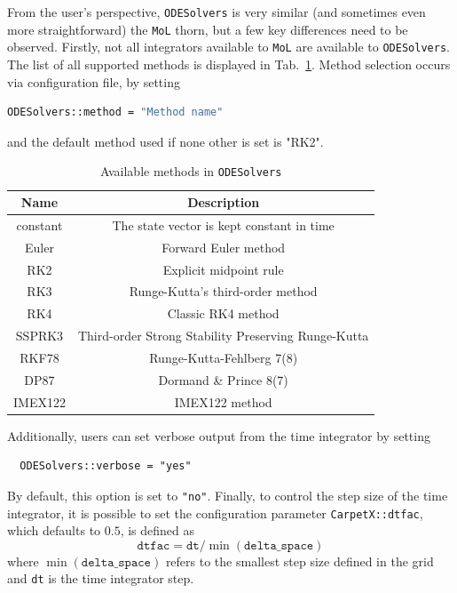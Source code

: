 From the user's perspective, \texttt{ODESolvers} is very similar (and sometimes even more straightforward) the \texttt{MoL} thorn, but a few key differences need to be observed. Firstly, not all integrators available to \texttt{MoL} are available to \texttt{ODESolvers}. The list of all supported methods is displayed in Tab.~\ref{tab:odesolvers_methods}. Method selection occurs via configuration file, by setting
%
\begin{lstlisting}[language=bash]
  ODESolvers::method = "Method name"
\end{lstlisting}
%
and the default method used if none other is set is "RK2".

\begin{table}[hb]
  \centering
  \begin{tabular}{cc}
  Name           & Description                                         \\ \hline\hline
  constant       & The state vector is kept constant in time           \\
  Euler          & Forward Euler method                                \\
  RK2            & Explicit midpoint rule                              \\
  RK3            & Runge-Kutta's third-order method                    \\
  RK4            & Classic RK4 method                                  \\
  SSPRK3         & Third-order Strong Stability Preserving Runge-Kutta \\
  RKF78          & Runge-Kutta-Fehlberg 7(8)                           \\
  DP87           & Dormand \& Prince 8(7)                              \\
  IMEX122        & IMEX122 method                                      \\ \hline\hline
  \end{tabular}
  \caption{Available methods in \texttt{ODESolvers}}
  \label{tab:odesolvers_methods}
\end{table}

Additionally, users can set verbose output from the time integrator by setting
%
\begin{lstlisting}
  ODESolvers::verbose = "yes"
\end{lstlisting}
%
By default, this option is set to \texttt{"no"}. Finally, to control the step size of the time integrator, it is possible to set the configuration parameter \texttt{CarpetX::dtfac}, which defaults to $0.5$, is defined as
%
\begin{equation}
  \texttt{dtfac} = \texttt{dt}/\min(\texttt{delta\_space})
\end{equation}
%
where $\min(\texttt{delta\_space})$ refers to the smallest step size defined in the \CarpetX\space grid and \texttt{dt} is the time integrator step.

